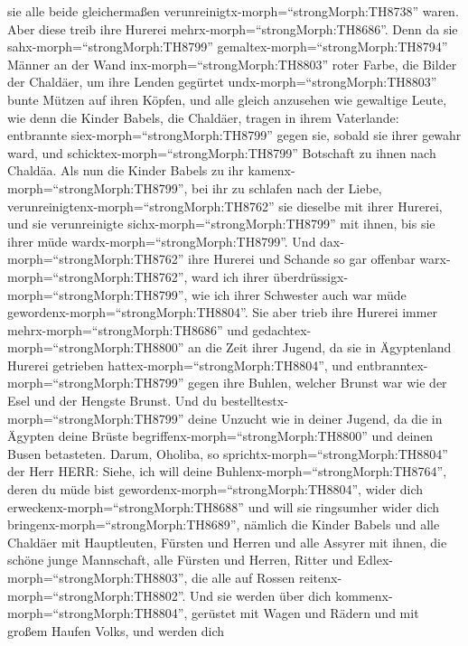 sie alle beide gleichermaßen verunreinigtx-morph=``strongMorph:TH8738''
waren.  Aber diese treib ihre Hurerei
mehrx-morph=``strongMorph:TH8686''. Denn da sie
sahx-morph=``strongMorph:TH8799'' gemaltex-morph=``strongMorph:TH8794''
Männer an der Wand inx-morph=``strongMorph:TH8803'' roter Farbe, die
Bilder der Chaldäer,  um ihre Lenden gegürtet
undx-morph=``strongMorph:TH8803'' bunte Mützen auf ihren Köpfen, und
alle gleich anzusehen wie gewaltige Leute, wie denn die Kinder Babels,
die Chaldäer, tragen in ihrem Vaterlande:  entbrannte
siex-morph=``strongMorph:TH8799'' gegen sie, sobald sie ihrer gewahr
ward, und schicktex-morph=``strongMorph:TH8799'' Botschaft zu ihnen nach
Chaldäa.  Als nun die Kinder Babels zu ihr
kamenx-morph=``strongMorph:TH8799'', bei ihr zu schlafen nach der Liebe,
verunreinigtenx-morph=``strongMorph:TH8762'' sie dieselbe mit ihrer
Hurerei, und sie verunreinigte sichx-morph=``strongMorph:TH8799'' mit
ihnen, bis sie ihrer müde wardx-morph=``strongMorph:TH8799''.
 Und dax-morph=``strongMorph:TH8762'' ihre Hurerei und
Schande so gar offenbar warx-morph=``strongMorph:TH8762'', ward ich
ihrer überdrüssigx-morph=``strongMorph:TH8799'', wie ich ihrer Schwester
auch war müde gewordenx-morph=``strongMorph:TH8804''.  Sie
aber trieb ihre Hurerei immer mehrx-morph=``strongMorph:TH8686'' und
gedachtex-morph=``strongMorph:TH8800'' an die Zeit ihrer Jugend, da sie
in Ägyptenland Hurerei getrieben hattex-morph=``strongMorph:TH8804'',
 und entbranntex-morph=``strongMorph:TH8799'' gegen ihre
Buhlen, welcher Brunst war wie der Esel und der Hengste Brunst.
 Und du bestelltestx-morph=``strongMorph:TH8799'' deine
Unzucht wie in deiner Jugend, da die in Ägypten deine Brüste
begriffenx-morph=``strongMorph:TH8800'' und deinen Busen betasteten.
 Darum, Oholiba, so sprichtx-morph=``strongMorph:TH8804''
der Herr HERR: Siehe, ich will deine
Buhlenx-morph=``strongMorph:TH8764'', deren du müde bist
gewordenx-morph=``strongMorph:TH8804'', wider dich
erweckenx-morph=``strongMorph:TH8688'' und will sie ringsumher wider
dich bringenx-morph=``strongMorph:TH8689'',  nämlich die
Kinder Babels und alle Chaldäer mit Hauptleuten, Fürsten und Herren und
alle Assyrer mit ihnen, die schöne junge Mannschaft, alle Fürsten und
Herren, Ritter und Edlex-morph=``strongMorph:TH8803'', die alle auf
Rossen reitenx-morph=``strongMorph:TH8802''.  Und sie
werden über dich kommenx-morph=``strongMorph:TH8804'', gerüstet mit
Wagen und Rädern und mit großem Haufen Volks, und werden dich
